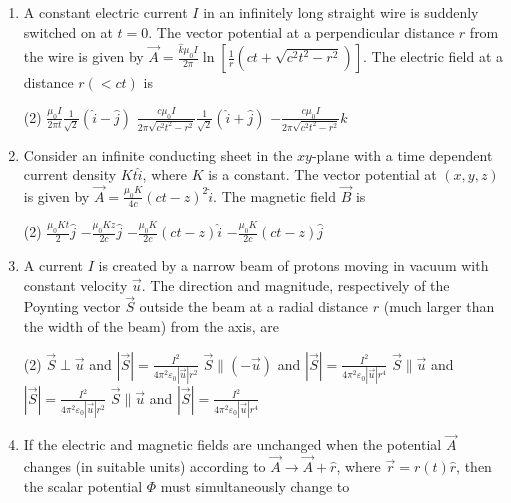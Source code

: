 \begin{enumerate}
	\item	A constant electric current $I$ in an infinitely long straight wire is suddenly switched on at $t=0$. The vector potential at a perpendicular distance $r$ from the wire is given by $\vec{A}=\frac{\hat{k} \mu_{0} I}{2 \pi} \ln \left[\frac{1}{r}\left(c t+\sqrt{c^{2} t^{2}-r^{2}}\right)\right]$. The electric field at a distance $r(<c t)$ is
	{}
	\begin{tasks}(2)
		\task[\textbf{B.}] $\frac{\mu_{0} I}{2 \pi t} \frac{1}{\sqrt{2}}(\hat{i}-\hat{j})$
		\task[\textbf{C.}] $\frac{c \mu_{0} I}{2 \pi \sqrt{c^{2} t^{2}-r^{2}}} \frac{1}{\sqrt{2}}(\hat{i}+\hat{j})$
		\task[\textbf{D.}] $-\frac{c \mu_{0} I}{2 \pi \sqrt{c^{2} t^{2}-r^{2}}} \hat{k}$
	\end{tasks}
	\item Consider an infinite conducting sheet in the $x y$-plane with a time dependent current density $K t \hat{i}$, where $K$ is a constant. The vector potential at $(x, y, z)$ is given by $\vec{A}=\frac{\mu_{0} K}{4 c}(c t-z)^{2} \hat{i}$. The magnetic field $\vec{B}$ is
	{	}
	\begin{tasks}(2)
		\task[\textbf{A.}] $\frac{\mu_{0} K t}{2} \hat{j}$
		\task[\textbf{B.}] $-\frac{\mu_{0} K z}{2 c} \hat{j}$
		\task[\textbf{C.}] $-\frac{\mu_{0} K}{2 c}(c t-z) \hat{i}$
		\task[\textbf{D.}] $-\frac{\mu_{0} K}{2 c}(c t-z) \hat{j}$
	\end{tasks}
	\item A current $I$ is created by a narrow beam of protons moving in vacuum with constant velocity $\vec{u}$. The direction and magnitude, respectively of the Poynting vector $\vec{S}$ outside the beam at a radial distance $r$ (much larger than the width of the beam) from the axis, are
	{	}
	\begin{tasks}(2)
		\task[\textbf{A.}] $\vec{S} \perp \vec{u}$ and $|\vec{S}|=\frac{I^{2}}{4 \pi^{2} \varepsilon_{0}|\vec{u}| r^{2}}$
		\task[\textbf{B.}] $\vec{S} \|(-\vec{u})$ and $|\vec{S}|=\frac{I^{2}}{4 \pi^{2} \varepsilon_{0}|\vec{u}| r^{4}}$
		\task[\textbf{C.}] $\vec{S} \| \vec{u}$ and $|\vec{S}|=\frac{I^{2}}{4 \pi^{2} \varepsilon_{0}|\vec{u}| r^{2}}$
		\task[\textbf{D.}] $\vec{S} \| \vec{u}$ and $|\vec{S}|=\frac{I^{2}}{4 \pi^{2} \varepsilon_{0}|\vec{u}| r^{4}}$
	\end{tasks}
	\item
	If the electric and magnetic fields are unchanged when the potential $\vec{A}$ changes (in suitable units) according to $\vec{A} \rightarrow \vec{A}+\hat{r}$, where $\vec{r}=r(t) \hat{r}$, then the scalar potential $\Phi$ must simultaneously change to

\end{enumerate}

